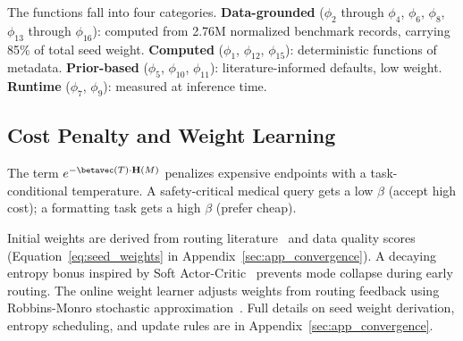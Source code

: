 The functions fall into four categories. \textbf{Data-grounded} ($\phi_2$ through $\phi_4$, $\phi_6$, $\phi_8$, $\phi_{13}$ through $\phi_{16}$): computed from 2.76M normalized benchmark records, carrying 85\% of total seed weight. \textbf{Computed} ($\phi_1$, $\phi_{12}$, $\phi_{15}$): deterministic functions of metadata. \textbf{Prior-based} ($\phi_5$, $\phi_{10}$, $\phi_{11}$): literature-informed defaults, low weight. \textbf{Runtime} ($\phi_7$, $\phi_9$): measured at inference time.

\subsection{Cost Penalty and Weight Learning}

The term $e^{-\betavec(T) \cdot \mathbf{H}(M)}$ penalizes expensive endpoints with a task-conditional temperature. A safety-critical medical query gets a low $\beta$ (accept high cost); a formatting task gets a high $\beta$ (prefer cheap).

Initial weights are derived from routing literature~\citep{chen2023frugalgpt, ong2024routellm, hu2024routerbench} and data quality scores (Equation~\ref{eq:seed_weights} in Appendix~\ref{sec:app_convergence}). A decaying entropy bonus inspired by Soft Actor-Critic~\citep{haarnoja2018sac} prevents mode collapse during early routing. The online weight learner adjusts weights from routing feedback using Robbins-Monro stochastic approximation~\citep{robbins1951stochastic}. Full details on seed weight derivation, entropy scheduling, and update rules are in Appendix~\ref{sec:app_convergence}.
